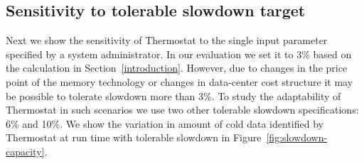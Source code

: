 %
%


\subsection{Sensitivity to tolerable slowdown target}
Next we show the sensitivity of Thermostat to the single input parameter
specified by a system administrator. In our evaluation we set it to 3\% based on
the calculation in Section~\ref{introduction}. However, due to changes in the
price point of the memory technology or changes in data-center cost structure
it may be  possible to tolerate slowdown more than 3\%. To study the adaptability of
Thermostat in such scenarios we use two other tolerable slowdown specifications: 6\%
and 10\%. We show the variation in amount of cold data identified by
Thermostat at run time with tolerable slowdown in Figure~\ref{fig:slowdown-capacity}.

